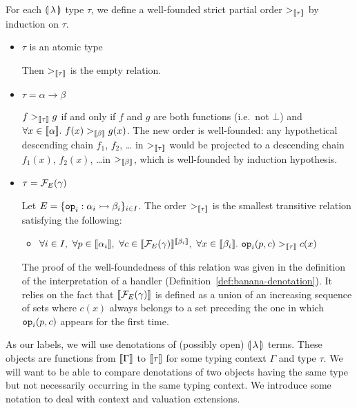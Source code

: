 \begin{definition}\label{def:order-on-denotations}
  For each $\llparenthesis \, \lambda \, \rrparenthesis$ type $\tau$, we define a well-founded strict
  partial order $>_{\llbracket \tau \rrbracket}$ by induction on $\tau$.

  \begin{itemize}
  \item $\tau$ is an atomic type

    Then $>_{\llbracket \tau \rrbracket}$ is the empty relation.

  \item $\tau = \alpha \to \beta$

    $f >_{\llbracket \tau \rrbracket} g$ if and only if $f$ and $g$ are both functions
    (i.e.\ not $\bot$) and
    $\forall x \in \llbracket \alpha \rrbracket.\ f(x) >_{\llbracket \beta \rrbracket} g(x)$. The new order
    is well-founded: any hypothetical descending chain $f_1$, $f_2$, \ldots
    in $>_{\llbracket \tau \rrbracket}$ would be projected to a descending chain $f_1(x)$,
    $f_2(x)$, \ldots in $>_{\llbracket \beta \rrbracket}$, which is well-founded by
    induction hypothesis.

  \item $\tau = \mathcal{F}_E(\gamma)$

    Let $E = \{\mathtt{op}_i : \alpha_i \rightarrowtail \beta_i\}_{i \in I}$. The
    order $>_{\llbracket \tau \rrbracket}$ is the smallest transitive relation satisfying
    the following:
    \begin{itemize}
    \item
      $\forall i \in I,\ \forall p \in \llbracket \alpha_i \rrbracket,\ \forall c \in
      \llbracket \mathcal{F}_E(\gamma) \rrbracket^{\llbracket \beta_i \rrbracket},\ \forall x \in \llbracket \beta_i \rrbracket.\
      \mathtt{op}_i(p, c) >_{\llbracket \tau \rrbracket} c(x)$
    \end{itemize}
    
    The proof of the well-foundedness of this relation was given in the
    definition of the interpretation of a handler
    (Definition~\ref{def:banana-denotation}). It relies on the fact that
    $\llbracket \mathcal{F}_E(\gamma) \rrbracket$ is defined as a union of an increasing sequence
    of sets where $c(x)$ always belongs to a set preceding the one in which
    $\mathtt{op}_i(p, c)$ appears for the first time.
  \end{itemize}
\end{definition}

As our labels, we will use denotations of (possibly open)
$\llparenthesis \, \lambda \, \rrparenthesis$ terms. These objects are functions from $\llbracket \Gamma \rrbracket$
to $\llbracket \tau \rrbracket$ for some typing context $\Gamma$ and type $\tau$. We will
want to be able to compare denotations of two objects having the same type
but not necessarily occurring in the same typing context. We introduce some
notation to deal with context and valuation extensions.

